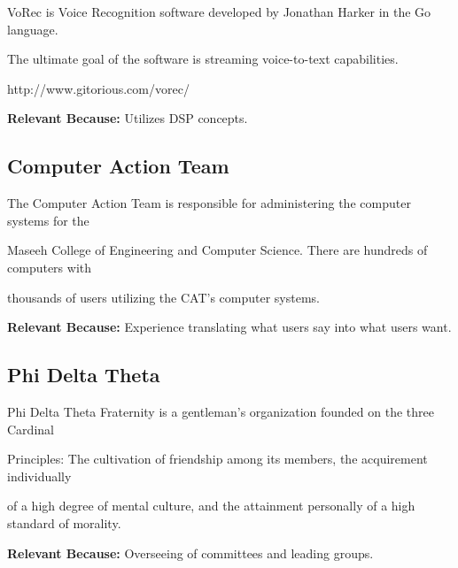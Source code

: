 \documentclass[10pt,letterpaper]{article}
\renewenvironment{itemize}{
  \begin{list}{}{
    \setlength{\leftmargin}{1.5em}
    \setlength{\itemsep}{0em}
    \setlength{\parskip}{0pt}
    \setlength{\parsep}{0em}
  }
}{
  \end{list}
}
\begin{document}
\begin{itemize}

    \item VoRec is Voice Recognition software developed by Jonathan Harker in the Go language.
    \item The ultimate goal of the software is streaming voice-to-text capabilities.
    \item http://www.gitorious.com/vorec/
    \item \textbf{Relevant Because:} Utilizes DSP concepts.
 
\end{itemize}

\subsection*{Computer Action Team}

\begin{itemize}

    \item The Computer Action Team is responsible for administering the computer systems for the
    \item Maseeh College of Engineering and Computer Science.  There are hundreds of computers with
    \item thousands of users utilizing the CAT's computer systems.
    \item \textbf{Relevant Because:} Experience translating what users say into what users want.

\end{itemize}

\subsection*{Phi Delta Theta}

\begin{itemize}

    \item Phi Delta Theta Fraternity is a gentleman's organization founded on the three Cardinal
    \item Principles: The cultivation of friendship among its members, the acquirement individually
    \item of a high degree of mental culture, and the attainment personally of a high standard of morality.
    \item \textbf{Relevant Because:} Overseeing of committees and leading groups.

\end{itemize}
\end{document}
